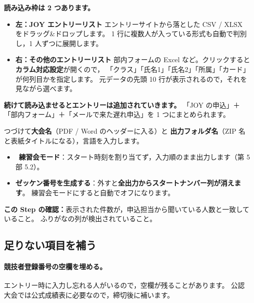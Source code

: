 \begin{J2M}
\textbf{読み込み枠は 2 つあります。}


\begin{itemize}
\item \textbf{左：JOY エントリーリスト}\quad
      エントリーサイトから落とした CSV / XLSX をドラッグ\&ドロップします。
      1 行に複数人が入っている形式も自動で判別し，1 人ずつに展開します。
\item \textbf{右：その他のエントリーリスト}\quad
      部内フォームの Excel など。クリックすると\textbf{カラム対応設定}が開くので，
      「クラス」「氏名1」「氏名2」「所属」「カード」が何列目かを指定します。
      元データの先頭 10 行が表示されるので，それを見ながら選べます。
\end{itemize}

\textbf{続けて読み込ませるとエントリーは追加されていきます。}
「JOY の申込」＋「部内フォーム」＋「メールで来た遅れ申込」を 1 つにまとめられます。


つづけて\textbf{大会名}（PDF / Word のヘッダーに入る）と
\textbf{出力フォルダ名}（ZIP 名と表紙タイトルになる），言語を入力します。


\begin{itemize}
\item \tPRAC\ \textbf{練習会モード}：スタート時刻を割り当てず，入力順のまま出力します（第 5 部 5.2）。
\item \textbf{ゼッケン番号を生成する}：外すと\textbf{全出力からスタートナンバー列が消えます}。
      練習会モードにすると自動でオフになります。
\end{itemize}

\textbf{この Step の確認：}表示された件数が，申込担当から聞いている人数と一致していること。
ふりがなの列が検出されていること。
\end{J2M}

\subsection*{足りない項目を補う}
\tRANK

\paragraph{競技者登録番号の空欄を埋める。}
エントリー時に入力し忘れる人がいるので，空欄が残ることがあります。
公認大会では公式成績表に必要なので，締切後に補います。

